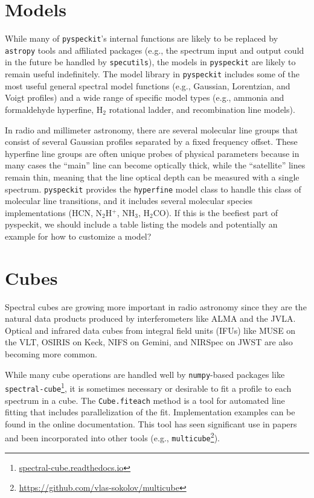 \documentclass[twocolumn]{aastex62}
\newcommand{\pyspeckit}{\texttt{pyspeckit}\xspace}
\newcommand{\astropy}{\texttt{astropy}\xspace}
\newcommand{\hh}{\ensuremath{\mathrm{H}_2}\xspace}
\begin{document}
\section{Models}
While many of \pyspeckit's internal functions are likely to be replaced by
\astropy tools and affiliated packages (e.g., the spectrum input and output
could in the future be handled by \texttt{specutils}), the models in \pyspeckit
are likely to remain useful indefinitely.  The model library in \pyspeckit
includes some of the most useful general spectral model functions (e.g.,
Gaussian, Lorentzian, and Voigt profiles) and a wide range of specific model
types (e.g., ammonia and formaldehyde hyperfine, \hh rotational ladder, and
recombination line models).

In radio and millimeter astronomy, there are several molecular line groups that
consist of several Gaussian profiles separated by a fixed frequency offset.
These hyperfine line groups are often unique probes of physical parameters
because in many cases the ``main'' line can become optically thick, while the
``satellite'' lines remain thin, meaning that the line optical depth can be
measured with a single spectrum.  \pyspeckit provides the \texttt{hyperfine}
model class to handle this class of molecular line transitions, and it includes
several molecular species implementations (HCN, N$_2$H$^+$, NH$_3$,
H$_2$CO). {\color{red}If this is the beefiest part of pyspeckit, we should include a table
listing the models and potentially an example for how to customize a model?}

\section{Cubes}
Spectral cubes are growing more important in radio astronomy since they are the
natural data products produced by interferometers like ALMA and the JVLA.
Optical and infrared data cubes from integral field units (IFUs) like MUSE on
the VLT, OSIRIS on Keck,  NIFS on Gemini, and NIRSpec on JWST are also becoming
more common.

While many cube operations are handled well by \texttt{numpy}-based packages
like \texttt{spectral-cube}\footnote{\url{spectral-cube.readthedocs.io}},
it is sometimes necessary or desirable to fit a profile to each spectrum
in a cube.  The \texttt{Cube.fiteach} method is a tool for automated line
fitting that includes parallelization of the fit. Implementation examples can be
found in the online documentation. This tool  has  seen significant use in
papers and been incorporated into other tools (e.g.,
\texttt{multicube}\footnote{\url{https://github.com/vlas-sokolov/multicube}}).
\end{document}
